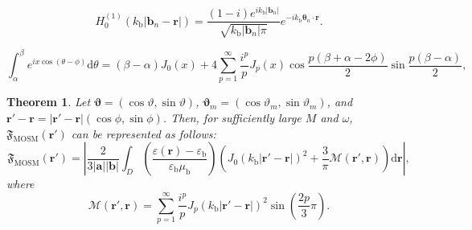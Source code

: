\documentclass[10pt,a4paper]{amsart}
\newtheorem{theorem}{Theorem}
\newcommand{\eps}{\varepsilon}
\newcommand{\epsb}{\varepsilon_{\mathrm{b}}}
\newcommand{\kb}{k_{\mathrm{b}}}
\newcommand{\ma}{\mathbf{a}}
\newcommand{\mb}{\mathbf{b}}
\DeclareMathOperator*{\mosm}{MOSM}
\newcommand{\mr}{\mathbf{r}}
\newcommand{\mub}{\mu_{\mathrm{b}}}
\newcommand{\rd}{\mathrm{d}}
\newcommand{\vt}{\boldsymbol{\theta}}
\newcommand{\vv}{\boldsymbol{\vartheta}}
\begin{document}
\begin{equation}\label{Asymptotic_Hankel}
H_0^{(1)}(\kb|\mb_n-\mr|)=\frac{(1-i)e^{i\kb|\mb_n|}}{\sqrt{\kb|\mb_n|\pi}}e^{-i\kb\vt_n\cdot\mr}.
\end{equation}

\begin{equation}\label{Jacobi-Anger}
\int_{\alpha}^{\beta}e^{ix\cos(\theta-\phi)}\rd\theta=(\beta-\alpha)J_0(x)+4\sum_{p=1}^{\infty}\frac{i^p}{p}J_p(x)\cos\frac{p(\beta+\alpha-2\phi)}{2}\sin\frac{p(\beta-\alpha)}{2},
\end{equation}

\begin{theorem}\label{OSM_Multiple}
  Let $\vv=(\cos\vartheta,\sin\vartheta)$, $\vv_m=(\cos\vartheta_m,\sin\vartheta_m)$, and $\mr'-\mr=|\mr'-\mr|(\cos\phi,\sin\phi)$. Then, for sufficiently large $M$ and $\omega$, $\mathfrak{F}_{\mosm}(\mr')$ can be represented as follows:
  \begin{equation}\label{Structure_Multiple}
    \mathfrak{F}_{\mosm}(\mr')=\left|\frac{2}{3|\ma||\mb|}\int_D\left(\frac{\eps(\mr)-\epsb}{\epsb\mub}\right)\left(J_0(\kb|\mr'-\mr|)^2+\frac{3}{\pi}\mathcal{M}(\mr',\mr)\right)\rd\mr\right|,
  \end{equation}
  where
  \[\mathcal{M}(\mr',\mr)=\sum_{p=1}^{\infty}\frac{i^p}{p}J_p(\kb|\mr'-\mr|)^2\sin\left(\frac{2p}{3}\pi\right).\]
\end{theorem}
\end{document}
